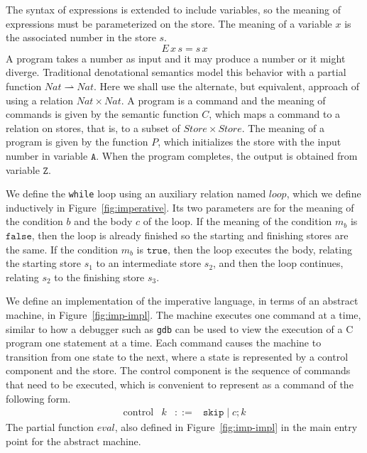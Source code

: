 \documentclass{tufte-handout}
\newcommand{\SEQ}[2]{#1 \mathrel{;} #2}
\newcommand{\SKIP}[0]{\mathtt{skip}}
\newcommand{\TRUE}[0]{\mathtt{true}}
\newcommand{\FALSE}[0]{\mathtt{false}}
\newcommand{\pto}[0]{\rightharpoonup}
\begin{document}
The syntax of expressions is extended to include variables, so the
meaning of expressions must be parameterized on the store. The meaning
of a variable $x$ is the associated number in the store $s$.
\[
  E\,x\,s = s\,x
\]
%
A program takes a number as input and it may produce a number or it
might diverge. Traditional denotational semantics model this behavior
with a partial function $\mathit{Nat}\pto\mathit{Nat}$. Here we shall
use the alternate, but equivalent, approach of using a relation
$\mathit{Nat}\times\mathit{Nat}$. A program is a command and the
meaning of commands is given by the semantic function $C$, which maps
a command to a relation on stores, that is, to a subset of
$\mathit{Store} \times \mathit{Store}$. The meaning of a program is
given by the function $P$, which initializes the store with the input
number in variable $\mathtt{A}$.  When the program completes, the
output is obtained from variable $\mathtt{Z}$.


We define the \texttt{while} loop using an auxiliary relation named
$\mathit{loop}$, which we define inductively in
Figure~\ref{fig:imperative}. Its two parameters are for the meaning of
the condition $b$ and the body $c$ of the loop.  If the meaning of the
condition $m_b$ is $\FALSE$, then the loop is already finished so the
starting and finishing stores are the same. If the condition $m_b$ is
$\TRUE$, then the loop executes the body, relating the starting store
$s_1$ to an intermediate store $s_2$, and then the loop continues,
relating $s_2$ to the finishing store $s_3$.




We define an implementation of the imperative language, in terms of an
abstract machine, in Figure~\ref{fig:imp-impl}. The machine executes
one command at a time, similar to how a debugger such as \texttt{gdb}
can be used to view the execution of a C program one statement at a
time. Each command causes the machine to transition from one state to
the next, where a state is represented by a control component and the
store. The control component is the sequence of commands that need to
be executed, which is convenient to represent as a command of the
following form.
\[
\begin{array}{lrcl}
  \text{control} & k & ::= & \SKIP \mid \SEQ{c}{k}
\end{array}
\]
The partial function $\mathit{eval}$, also defined in
Figure~\ref{fig:imp-impl} in the main entry point for the abstract
machine.
\end{document}
